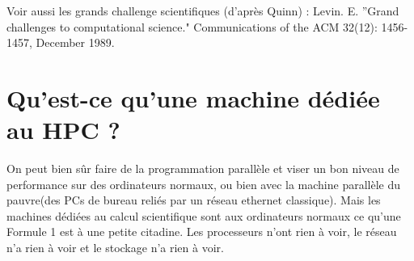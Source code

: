Voir aussi les grands challenge scientifiques (d'après Quinn) :
Levin. E. ''Grand challenges to computational science." Communications of the
ACM 32(12): 1456-1457, December 1989.

\section{Qu'est-ce qu'une machine dédiée au HPC ?}

On peut bien sûr faire de la programmation parallèle et viser un bon niveau de
performance sur des ordinateurs \og normaux\fg, ou bien avec la \og machine
parallèle du pauvre\fg (des PCs de bureau reliés par un réseau ethernet
classique). Mais les machines dédiées au calcul scientifique sont aux
ordinateurs normaux ce qu'une Formule 1 est à une petite citadine. Les
processeurs n'ont rien à voir, le réseau n'a rien à voir et le stockage n'a rien
à voir.

